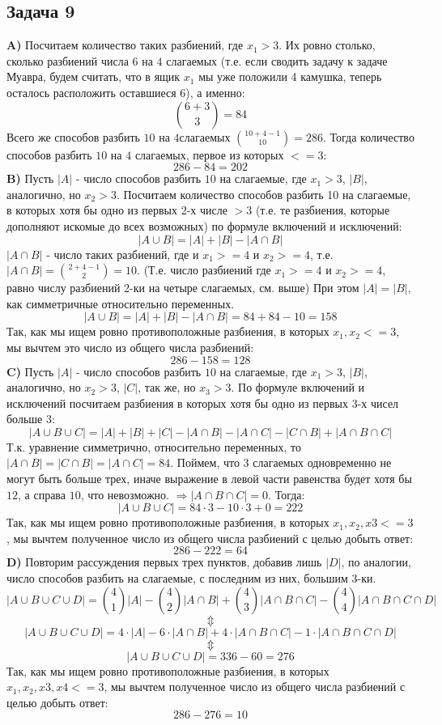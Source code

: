 \documentclass{article}
\begin{document}
 \begin{center}
 	\subsection*{Задача 9}
 \end{center}
 \textbf{A)} Посчитаем количество таких разбиений, где $x_1 > 3$. Их ровно столько, сколько разбиений числа $6$ на $4$  слагаемых (т.е. если сводить задачу к задаче Муавра, будем считать, что в ящик $x_1$ мы уже положили 4 камушка, теперь осталось расположить оставшиеся 6), а именно:
 $$ {6 + 3 \choose 3} = 84 $$
 Всего же способов разбить $10$ на $ 4 $слагаемых $ {10 + 4 - 1 \choose 10} = 286 $.
 Тогда количество способов разбить $10$ на $ 4$ слагаемых, первое из которых $<= 3$:
 $$ 286 - 84 = 202 $$
 \textbf{B)} Пусть $ |A| $ - число способов разбить $10$ на слагаемые, где $ x_1 > 3 $, $ |B| $, аналогично, но $ x_2 > 3 $. Посчитаем количество способов разбить 10 на слагаемые, в которых хотя бы одно из первых 2-х числе $>3$ (т.е. те разбиения, которые дополняют искомые до всех возможных) по формуле включений и исключений:
 $$ |A \cup B| = |A| + |B| - |A \cap B|$$
 $|A \cap B|$ - число таких разбиений, где и $x_1 >= 4$ и $x_2 >= 4$, т.е. $ |A \cap B| = {2 + 4 - 1 \choose 2} = 10$. (Т.е. число разбиений где $x_1 >= 4$ и $x_2 >= 4$, равно числу разбиений 2-ки на четыре слагаемых, см. выше)
 При этом $ |A| = |B|  $, как симметричные относительно переменных.
  $$ |A \cup B| = |A| + |B| - |A \cap B| = 84 + 84 - 10 = 158$$
 Так, как мы ищем ровно противоположные разбиения, в которых $ x_1, x_2 <= 3$, мы вычтем это число из общего числа разбиений:
 $$ 286 - 158 = 128 $$
 \textbf{C)} Пусть $ |A| $ - число способов разбить $10$ на слагаемые, где $ x_1 > 3 $, $ |B| $, аналогично, но $ x_2 > 3 $, $ |C| $, так же, но $ x_3 > 3 $. По формуле включений и исключений посчитаем разбиения в которых хотя бы одно из первых 3-х чисел больше 3:
 $$ |A \cup B \cup C| = |A| + |B| + |C| - |A \cap B| -  |A \cap C| -  |C \cap B| +  |A \cap B \cap C|$$
 Т.к. уравнение симметрично, относительно переменных, то $|A \cap B| = |C \cap B| = |A \cap C| = 84$. Поймем, что $3$ слагаемых одновременно не могут быть больше трех, иначе выражение в левой части равенства будет хотя бы $12$, а справа $10$, что невозможно. $ \Rightarrow |A \cap B \cap C| = 0$. Тогда:
 $$  |A \cup B \cup C| = 84 \cdot 3 - 10 \cdot 3 + 0 = 222$$
 Так, как мы ищем ровно противоположные разбиения, в которых $ x_1, x_2, x3 <= 3$, мы вычтем полученное число из общего числа разбиений с целью добыть ответ:
 $$ 286 - 222 = 64 $$
 \textbf{D)} Повторим рассуждения первых трех пунктов, добавив лишь $ |D| $, по аналогии, число способов разбить на слагаемые, с последним из них, большим 3-ки. 
  $$ |A \cup B \cup C \cup D| = {4 \choose 1} |A| - {4 \choose 2} |A \cap B| + {4 \choose 3} |A \cap B \cap C| - {4 \choose 4} |A \cap B \cap C \cap D|$$
  $$\Updownarrow$$
  $$ |A \cup B \cup C \cup D| = 4 \cdot |A| - 6 \cdot |A \cap B| + 4 \cdot |A \cap B \cap C| - 1 \cdot |A \cap B \cap C \cap D|$$
  $$\Updownarrow$$
  $$ |A \cup B \cup C \cup D| = 336 - 60 = 276 $$
  Так, как мы ищем ровно противоположные разбиения, в которых $ x_1, x_2, x3, x4 <= 3$, мы вычтем полученное число из общего числа разбиений с целью добыть ответ:
  $$ 286 - 276 = 10 $$
 
\end{document}
